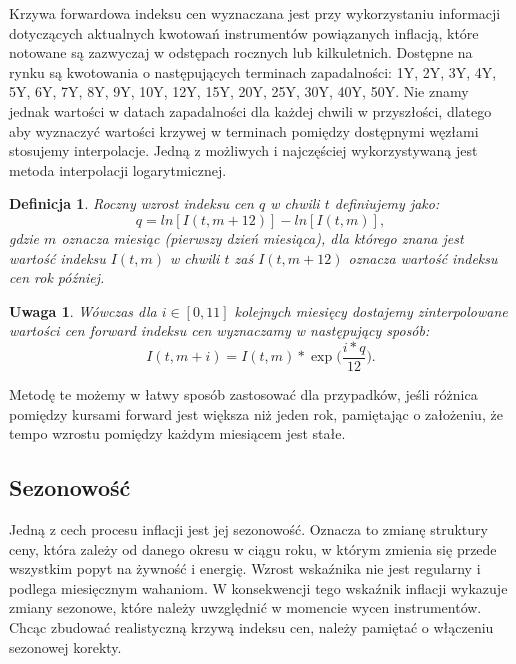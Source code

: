 \documentclass{mini}
\theoremstyle{mythstyle}
\newtheorem{Definicja}{Definicja}[chapter]
\newtheorem{Uwaga}{Uwaga}[chapter]
\begin{document}
	Krzywa forwardowa indeksu cen wyznaczana jest przy wykorzystaniu informacji dotyczących aktualnych kwotowań instrumentów powiązanych inflacją, które notowane  są zazwyczaj w odstępach rocznych lub kilkuletnich. Dostępne na rynku są kwotowania o następujących terminach zapadalności: 1Y, 2Y, 3Y, 4Y, 5Y, 6Y, 7Y, 8Y, 9Y, 10Y, 12Y, 15Y, 20Y, 25Y, 30Y, 40Y, 50Y. Nie znamy jednak wartości w datach zapadalności dla każdej chwili w przyszłości, dlatego aby wyznaczyć wartości krzywej w terminach pomiędzy dostępnymi węzłami stosujemy interpolacje. Jedną z możliwych i najczęściej wykorzystywaną jest metoda interpolacji logarytmicznej. \\
	\begin{Definicja}
		Roczny wzrost indeksu cen $q$ w chwili $t$ definiujemy jako:
		\begin{equation}
		q = ln [I(t,m + 12)] - ln[I(t,m)],
		\end{equation} 
		gdzie $m$ oznacza miesiąc (pierwszy dzień miesiąca), dla którego znana jest wartość indeksu $I(t,m)$ w chwili $t$ zaś $I(t,m+12)$ oznacza wartość indeksu cen rok później.\\
	\end{Definicja}
	
	\begin{Uwaga}
		Wówczas dla $i \in [0,11]$ kolejnych miesięcy dostajemy zinterpolowane wartości cen forward indeksu cen wyznaczamy w następujący sposób: 
		\begin{equation}
		I(t,m + i) = I(t,m) * \exp\bigg(\frac{i*q}{12}\bigg).
		\end{equation}
	\end{Uwaga}
	
	Metodę te możemy w łatwy sposób zastosować dla przypadków, jeśli różnica pomiędzy kursami forward jest większa niż jeden rok, pamiętając o założeniu, że tempo wzrostu pomiędzy każdym miesiącem jest stałe.
	
	\subsection{Sezonowość}
	Jedną z cech procesu inflacji jest jej sezonowość. Oznacza to zmianę struktury ceny, która zależy od danego okresu w ciągu roku, w którym zmienia się przede wszystkim popyt na żywność i energię. Wzrost wskaźnika nie jest regularny i podlega miesięcznym wahaniom. W konsekwencji tego wskaźnik inflacji wykazuje zmiany sezonowe, które należy uwzględnić w momencie wycen instrumentów. Chcąc zbudować realistyczną krzywą indeksu cen, należy pamiętać o włączeniu sezonowej korekty.
\end{document}
